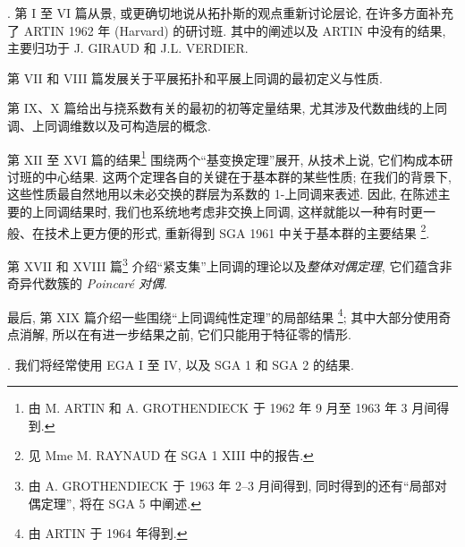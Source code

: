 . 第 I 至 VI 篇从景, 或更确切地说从拓扑斯的观点重新讨论层论,
在许多方面补充了 ARTIN 1962 年 (Harvard) 的研讨班.
其中的阐述以及 ARTIN 中没有的结果, 主要归功于 J. GIRAUD 和 J.L. VERDIER.

第 VII 和 VIII 篇发展关于平展拓扑和平展上同调的最初定义与性质.

第 IX、X 篇给出与挠系数有关的最初的初等定量结果,
尤其涉及代数曲线的上同调、上同调维数以及可构造层的概念.

\begingroup{}
第 XII 至 XVI 篇的结果\footnote[2]{由 M. ARTIN 和 A. GROTHENDIECK 于 1962 年 9 月至 1963 年 3 月间得到.}
围绕两个“基变换定理”展开,
从技术上说, 它们构成本研讨班的中心结果.
这两个定理各自的关键在于基本群的某些性质;
在我们的背景下, 这些性质最自然地用以未必交换的群层为系数的 1-上同调来表述.
因此, 在陈述主要的上同调结果时, 我们也系统地考虑非交换上同调,
这样就能以一种有时更一般、在技术上更方便的形式,
重新得到 SGA 1961 中关于基本群的主要结果
\begingroup\renewcommand{\thefootnote}{\fnsymbol{footnote}}
\footnote[1]{见 Mme M. RAYNAUD 在 SGA 1 XIII 中的报告.}\endgroup.
\par\endgroup

\begingroup{}
第 XVII 和 XVIII 篇\footnote[3]{由 A. GROTHENDIECK 于 1963 年 2--3 月间得到,
同时得到的还有“局部对偶定理”, 将在 SGA 5 中阐述.}
介绍“紧支集”上同调的理论以及\emph{整体对偶定理},
它们蕴含非奇异代数簇的 \emph{Poincaré 对偶}.

最后, 第 XIX 篇介绍一些围绕“上同调纯性定理”的局部结果
\footnote[4]{由 ARTIN 于 1964 年得到.};
其中大部分使用奇点消解,
所以在有进一步结果之前, 它们只能用于特征零的情形.
\par\endgroup

. 我们将经常使用 EGA I 至 IV, 以及 SGA 1 和 SGA 2 的结果.
